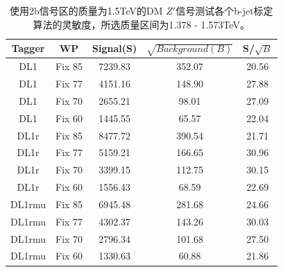 \begin{table}[ht]
	\begin{center}
		\begin{tabular}{|c|c|c|c|c|}\hline
			Tagger       & WP          & Signal(S)    & $\sqrt{Background(B)}$    & S/$\sqrt{B}$ \\\hline
			DL1          & Fix 85      & 7239.83      & 352.07        & 20.56        \\
			DL1          & Fix 77      & 4151.16      & 148.90        & 27.88        \\
			DL1          & Fix 70      & 2655.21      & 98.01         & 27.09        \\
			DL1          & Fix 60      & 1445.55      & 65.57         & 22.04        \\
			\hline
			DL1r          & Fix 85      & 8477.72      & 390.54        & 21.71        \\
			DL1r          & Fix 77      & 5159.21      & 166.65        & 30.96        \\
			DL1r          & Fix 70      & 3399.15      & 112.75        & 30.15        \\
			DL1r          & Fix 60      & 1556.43      & 68.59         & 22.69        \\
			\hline
			DL1rmu          & Fix 85      & 6945.48      & 281.68        & 24.66        \\
			DL1rmu          & Fix 77      & 4302.37      & 143.26        & 30.03        \\
			DL1rmu          & Fix 70      & 2796.34      & 101.68        & 27.50        \\
			DL1rmu          & Fix 60      & 1330.63      & 60.88         & 21.86        \\
			\hline
		\end{tabular}
	\end{center}
	\caption{使用2b信号区的质量为1.5TeV的DM $Z\prime$信号测试各个b-jet标定算法的灵敏度，所选质量区间为1.378 - 1.573TeV。}
	\label{tab:SenZ1p5TeV}
\end{table}%

